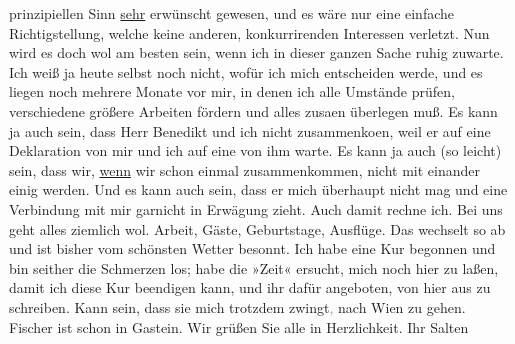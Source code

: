\begin{ledgroupsized}[t]{13cm}
               prinzipiellen Sinn \uline{sehr} erwünscht gewesen, und es
               wäre nur eine einfache Richtigstellung, welche keine anderen, konkurrirenden
               Interessen verletzt. Nun wird es doch wol am besten sein, wenn ich in dieser ganzen
               Sache ruhig zuwarte. Ich weiß ja heute selbst {\pb}noch nicht, wofür ich mich
               entscheiden werde, und es liegen noch mehrere Monate vor mir, in denen ich alle
               Umstände prüfen, verschiedene größere Arbeiten fördern und alles zusa{\geminationm}en überlegen muß. Es kann ja auch sein, dass Herr Benedikt und ich nicht zusammenko{\geminationm}en, weil er auf eine Deklaration von mir und ich auf
               eine von ihm warte. Es kann ja auch (so leicht) sein, dass wir, \uline{wenn} wir schon einmal zusammenkommen, nicht mit einander einig werden.
               Und es kann auch sein, dass er mich überhaupt nicht mag und eine Verbindung mit mir
               garnicht in Erwägung zieht. Auch damit rechne ich.\pend
           \pstart
           Bei uns geht alles ziemlich
               wol. Arbeit, Gäste, Geburtstage, Ausflüge. Das wechselt so ab und ist bisher vom
               schönsten Wetter besonnt. Ich habe eine Kur begonnen und bin seither die Schmerzen
               los; habe die »Zeit« ersucht, mich noch hier zu laßen, damit ich diese
               Kur beendigen kann, und ihr dafür angeboten, von hier aus zu schreiben. Kann sein,
               dass sie mich trotzdem zwingt\textcolor{gray}{,} nach Wien zu gehen. Fischer ist schon in
                  Gastein. Wir grüßen Sie alle in
               Herzlichkeit.\pend
           \pstart Ihr \spacefill\mbox{Salten}\pend{}
         
         \endnumbering{}\end{ledgroupsized}  \newcommand{\dateiname}{L03553}\newcommand{\titel}{Felix Salten an Arthur Schnitzler, 16. 8. 1911}\newcommand{\editorInnen}{Martin Anton Müller und Laura Untner}
      
